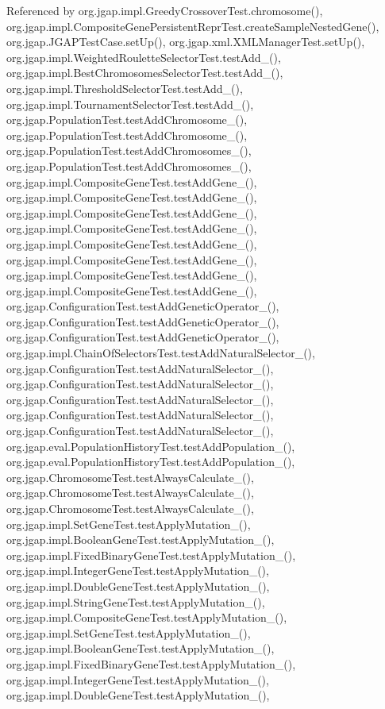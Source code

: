 Referenced by org.\-jgap.\-impl.\-Greedy\-Crossover\-Test.\-chromosome(), org.\-jgap.\-impl.\-Composite\-Gene\-Persistent\-Repr\-Test.\-create\-Sample\-Nested\-Gene(), org.\-jgap.\-J\-G\-A\-P\-Test\-Case.\-set\-Up(), org.\-jgap.\-xml.\-X\-M\-L\-Manager\-Test.\-set\-Up(), org.\-jgap.\-impl.\-Weighted\-Roulette\-Selector\-Test.\-test\-Add\-\_(), org.\-jgap.\-impl.\-Best\-Chromosomes\-Selector\-Test.\-test\-Add\-\_(), org.\-jgap.\-impl.\-Threshold\-Selector\-Test.\-test\-Add\-\_(), org.\-jgap.\-impl.\-Tournament\-Selector\-Test.\-test\-Add\-\_(), org.\-jgap.\-Population\-Test.\-test\-Add\-Chromosome\-\_(), org.\-jgap.\-Population\-Test.\-test\-Add\-Chromosome\-\_(), org.\-jgap.\-Population\-Test.\-test\-Add\-Chromosomes\-\_(), org.\-jgap.\-Population\-Test.\-test\-Add\-Chromosomes\-\_(), org.\-jgap.\-impl.\-Composite\-Gene\-Test.\-test\-Add\-Gene\-\_(), org.\-jgap.\-impl.\-Composite\-Gene\-Test.\-test\-Add\-Gene\-\_(), org.\-jgap.\-impl.\-Composite\-Gene\-Test.\-test\-Add\-Gene\-\_(), org.\-jgap.\-impl.\-Composite\-Gene\-Test.\-test\-Add\-Gene\-\_(), org.\-jgap.\-impl.\-Composite\-Gene\-Test.\-test\-Add\-Gene\-\_(), org.\-jgap.\-impl.\-Composite\-Gene\-Test.\-test\-Add\-Gene\-\_(), org.\-jgap.\-impl.\-Composite\-Gene\-Test.\-test\-Add\-Gene\-\_(), org.\-jgap.\-impl.\-Composite\-Gene\-Test.\-test\-Add\-Gene\-\_(), org.\-jgap.\-Configuration\-Test.\-test\-Add\-Genetic\-Operator\-\_(), org.\-jgap.\-Configuration\-Test.\-test\-Add\-Genetic\-Operator\-\_(), org.\-jgap.\-Configuration\-Test.\-test\-Add\-Genetic\-Operator\-\_(), org.\-jgap.\-impl.\-Chain\-Of\-Selectors\-Test.\-test\-Add\-Natural\-Selector\-\_(), org.\-jgap.\-Configuration\-Test.\-test\-Add\-Natural\-Selector\-\_(), org.\-jgap.\-Configuration\-Test.\-test\-Add\-Natural\-Selector\-\_(), org.\-jgap.\-Configuration\-Test.\-test\-Add\-Natural\-Selector\-\_(), org.\-jgap.\-Configuration\-Test.\-test\-Add\-Natural\-Selector\-\_(), org.\-jgap.\-Configuration\-Test.\-test\-Add\-Natural\-Selector\-\_(), org.\-jgap.\-eval.\-Population\-History\-Test.\-test\-Add\-Population\-\_(), org.\-jgap.\-eval.\-Population\-History\-Test.\-test\-Add\-Population\-\_(), org.\-jgap.\-Chromosome\-Test.\-test\-Always\-Calculate\-\_(), org.\-jgap.\-Chromosome\-Test.\-test\-Always\-Calculate\-\_(), org.\-jgap.\-Chromosome\-Test.\-test\-Always\-Calculate\-\_(), org.\-jgap.\-impl.\-Set\-Gene\-Test.\-test\-Apply\-Mutation\-\_(), org.\-jgap.\-impl.\-Boolean\-Gene\-Test.\-test\-Apply\-Mutation\-\_(), org.\-jgap.\-impl.\-Fixed\-Binary\-Gene\-Test.\-test\-Apply\-Mutation\-\_(), org.\-jgap.\-impl.\-Integer\-Gene\-Test.\-test\-Apply\-Mutation\-\_(), org.\-jgap.\-impl.\-Double\-Gene\-Test.\-test\-Apply\-Mutation\-\_(), org.\-jgap.\-impl.\-String\-Gene\-Test.\-test\-Apply\-Mutation\-\_(), org.\-jgap.\-impl.\-Composite\-Gene\-Test.\-test\-Apply\-Mutation\-\_(), org.\-jgap.\-impl.\-Set\-Gene\-Test.\-test\-Apply\-Mutation\-\_(), org.\-jgap.\-impl.\-Boolean\-Gene\-Test.\-test\-Apply\-Mutation\-\_(), org.\-jgap.\-impl.\-Fixed\-Binary\-Gene\-Test.\-test\-Apply\-Mutation\-\_(), org.\-jgap.\-impl.\-Integer\-Gene\-Test.\-test\-Apply\-Mutation\-\_(), org.\-jgap.\-impl.\-Double\-Gene\-Test.\-test\-Apply\-Mutation\-\_(), 